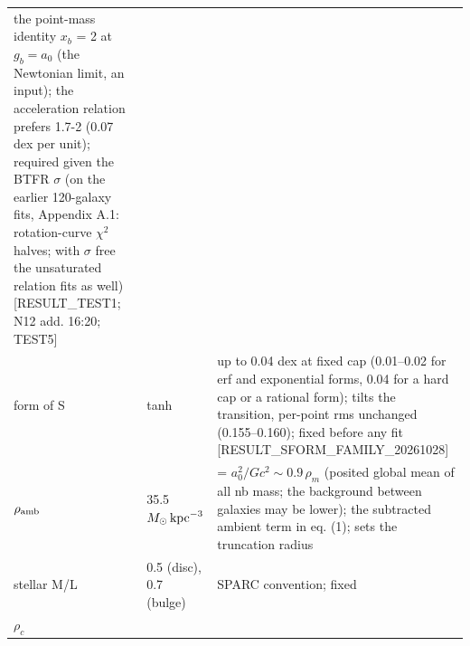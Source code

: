 \documentclass[
  10pt,
]{article}
\begin{document}
\begin{longtable}[]{@{}lll@{}}
\begin{minipage}[t]{0.50\columnwidth}
the point-mass identity $x_b$ = 2 at $g_b=a_0$ (the Newtonian limit, an input); the acceleration relation prefers 1.7-2 (0.07 dex per unit); required given the BTFR $\sigma$ (on the earlier 120-galaxy fits, Appendix A.1: rotation-curve $\chi^2$ halves; with $\sigma$ free the unsaturated relation fits as well) {[}RESULT\_TEST1; N12 add.
16:20; TEST5{]}\strut
\end{minipage}\tabularnewline
\begin{minipage}[t]{0.24\columnwidth}\raggedright
form of S\strut
\end{minipage} & \begin{minipage}[t]{0.20\columnwidth}\raggedright
tanh\strut
\end{minipage} & \begin{minipage}[t]{0.50\columnwidth}\raggedright
up to 0.04 dex at fixed cap (0.01--0.02 for erf and exponential forms, 0.04 for a hard cap or a rational form); tilts the transition, per-point rms unchanged (0.155--0.160); fixed before any fit {[}RESULT\_SFORM\_FAMILY\_20261028{]}\strut
\end{minipage}\tabularnewline
\begin{minipage}[t]{0.24\columnwidth}\raggedright
$\rho_{\rm amb}$\strut
\end{minipage} & \begin{minipage}[t]{0.20\columnwidth}\raggedright
35.5 $M_\odot\,{\rm kpc}^{-3}$\strut
\end{minipage} & \begin{minipage}[t]{0.50\columnwidth}\raggedright
= $a_0^2/Gc^2\sim 0.9\,\rho_m$ (posited global mean of all nb mass; the background between galaxies may be lower); the subtracted ambient
term in eq. (1); sets the truncation radius\strut
\end{minipage}\tabularnewline
\begin{minipage}[t]{0.24\columnwidth}\raggedright
stellar M/L\strut
\end{minipage} & \begin{minipage}[t]{0.20\columnwidth}\raggedright
0.5 (disc), 0.7 (bulge)\strut
\end{minipage} & \begin{minipage}[t]{0.50\columnwidth}\raggedright
SPARC convention; fixed\strut
\end{minipage}\tabularnewline
\begin{minipage}[t]{0.24\columnwidth}\raggedright
$\rho_c$\strut
\end{minipage} & \begin{minipage}[t]{0.20\columnwidth}\raggedright

\end{minipage}
\end{longtable}
\end{document}
